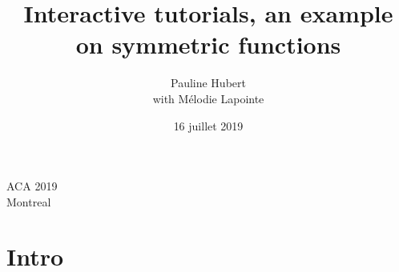\documentclass[10pt]{beamer}
\title[]{Interactive tutorials, an example on symmetric	functions}
\author{Pauline Hubert \\ with Mélodie Lapointe}
\institute{Université du Québec à Montréal \\ (UQAM)}
\date[]{16 juillet 2019}
\newcommand{\blue}[1]{{\color[rgb]{0,0.4,1}{#1}}}
\newcommand{\red}[1]{{\color{red}{#1}}}
\newcommand{\green}[1]{{\color[rgb]{0,0.55,0.25}{#1}}}
\newcommand{\purple}[1]{{\color[rgb]{.7,.2,1}{#1}}}
\newcommand{\orange}[1]{{\color[rgb]{1,.35,0}{#1}}}
\newenvironment{myblock}[3]{%
	\setbeamercolor{block body}{#2}
	\setbeamercolor{block title}{#3}
	\begin{block}{#1}}{\end{block}}
\begin{document}
\begin{frame}
\titlepage

\begin{center}	
ACA 2019 \\
Montreal
\end{center}

\end{frame}


\section{Intro}

%
%
%
%
%
%
%
%

%	
%	
%	
%	
%	
\end{document}
